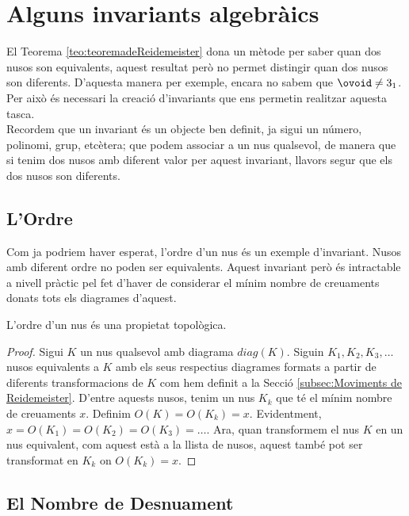 
\section{Alguns invariants algebràics}\label{sec:Invariantsalgebraics}

El Teorema \ref{teo:teoremadeReidemeister} dona un mètode per saber quan dos nusos son equivalents, aquest resultat però no permet distingir quan dos nusos son diferents. D'aquesta manera per exemple, encara no sabem que $\ovoid\neq 3_1$. Per això és necessari la creació d'invariants que ens permetin realitzar aquesta tasca.\\

Recordem que un invariant és un objecte ben definit, ja sigui un número, polinomi, grup, etcètera; que podem associar a un nus qualsevol, de manera que si tenim dos nusos amb diferent valor per aquest invariant, llavors segur que els dos nusos son diferents.

\subsection{L'Ordre}\label{sec:ordrecomainvariant}

Com ja podriem haver esperat, l'ordre d'un nus és un exemple d'invariant. Nusos amb diferent ordre no poden ser equivalents. Aquest invariant però és intractable a nivell pràctic pel fet d'haver de considerar el mínim nombre de creuaments donats tots els diagrames d'aquest.\\

\begin{proposition}
	L'ordre d'un nus és una propietat topològica.
\end{proposition}

\begin{proof}
	Sigui $K$ un nus qualsevol amb diagrama $diag(K)$. Siguin $K_1, K_2, K_3, \dots$ nusos equivalents a $K$ amb els seus respectius diagrames formats a partir de diferents transformacions de $K$ com hem definit a la Secció \ref{subsec:Moviments de Reidemeister}. D'entre aquests nusos, tenim un nus $K_k$ que té el mínim nombre de creuaments $x$. Definim $O(K)=O(K_k)=x$. Evidentment, $x=O(K_1)=O(K_2)=O(K_3)=\dots$. Ara, quan transformem el nus $K$ en un nus equivalent, com aquest està a la llista de nusos, aquest també pot ser transformat en $K_k$ on $O(K_k)=x$.
\end{proof}

\subsection{El Nombre de Desnuament}\label{sec:desnuamentcomainvariant}

